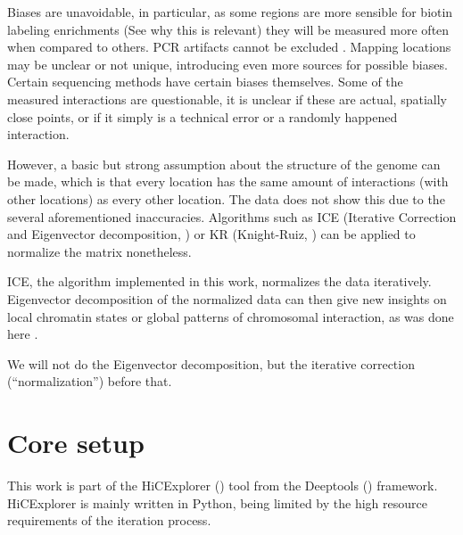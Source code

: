 Biases are unavoidable, in particular, as some regions are more sensible for
biotin labeling enrichments (See  why this is relevant) they
will be measured more often when compared to others. PCR artifacts cannot be
excluded \cite{acinas2005pcr}. Mapping locations may be unclear or not unique,
introducing even more sources for possible biases. Certain sequencing methods
have certain biases themselves. Some of the measured interactions are
questionable, it is unclear if these are actual, spatially close points, or if
it simply is a technical error or a randomly happened interaction.


However, a basic but strong assumption about the structure of the genome can be
made, which is that every location has the same amount of interactions (with
other locations) as every other location. The data does not show this due to
the several aforementioned inaccuracies. Algorithms such as ICE
\cite{imakaev2012iterative} (Iterative Correction and Eigenvector
decomposition, ) or KR \cite{knight2013fast} (Knight-Ruiz,
) can be applied to normalize the matrix nonetheless.

ICE, the algorithm implemented in this work, normalizes the data iteratively.
Eigenvector decomposition of the normalized data can then give new insights on
local chromatin states or global patterns of chromosomal interaction, as was
done here \cite{imakaev2012iterative}.

We will not do the Eigenvector decomposition, but the iterative correction
(``normalization'') before that.


\section{Core setup}\label{sec:setup}



This work is part of the HiCExplorer () tool from the
Deeptools () framework. HiCExplorer is mainly written in
Python, being limited by the high resource requirements of the iteration process.


